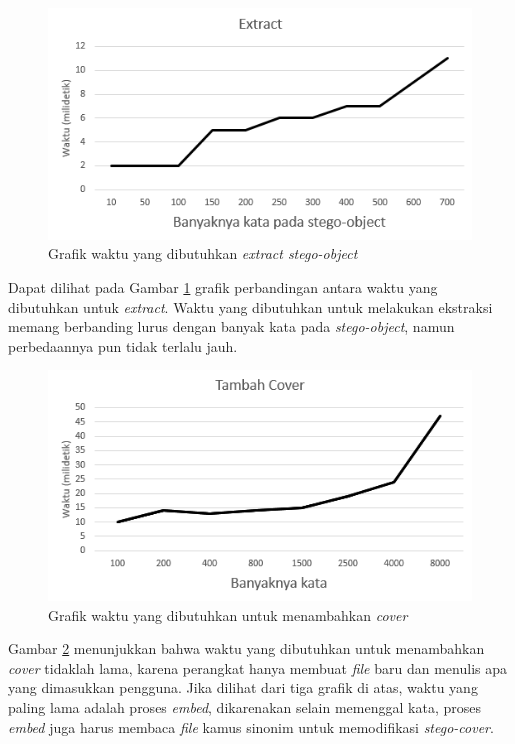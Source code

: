 \begin{figure}[H]
	\centering
	\includegraphics[scale=0.8]{Gambar/graf-extract}
	\caption{Grafik waktu yang dibutuhkan \textit{extract stego-object}} 
	\label{fig:graf-extract}
\end{figure}

Dapat dilihat pada Gambar \ref{fig:graf-extract} grafik perbandingan antara waktu yang dibutuhkan untuk \textit{extract}. Waktu yang dibutuhkan untuk melakukan ekstraksi memang berbanding lurus dengan banyak kata pada \textit{stego-object}, namun perbedaannya pun tidak terlalu jauh.

\begin{figure}[H]
	\centering
	\includegraphics[scale=0.8]{Gambar/graf-tambah-cover}
	\caption{Grafik waktu yang dibutuhkan untuk menambahkan \textit{cover}} 
	\label{fig:graf-tambah-cover}
\end{figure}

Gambar \ref{fig:graf-tambah-cover} menunjukkan bahwa waktu yang dibutuhkan untuk menambahkan \textit{cover} tidaklah lama, karena perangkat hanya membuat \textit{file} baru dan menulis apa yang dimasukkan pengguna. Jika dilihat dari tiga grafik di atas, waktu yang paling lama adalah proses \textit{embed}, dikarenakan selain memenggal kata, proses \textit{embed} juga harus membaca \textit{file} kamus sinonim untuk memodifikasi \textit{stego-cover}.

